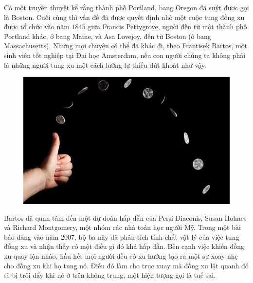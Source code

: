 \vspace*{185pt}

%
%

\begin{multicols}{2}
	Có một truyền thuyết  kể rằng thành phố Portland, bang Oregon đã suýt được gọi là Boston. Cuối cùng thì vấn đề đã được quyết định nhờ một cuộc tung đồng xu được tổ chức vào năm $1845$ giữa Francis Pettygrove, người đến từ một thành phố Portland khác, ở bang Maine, và Asa Lovejoy, đến từ Boston (ở bang Massachusetts). Nhưng mọi chuyện có thể đã khác đi, theo Frantisek Bartos, một sinh viên tốt nghiệp tại Đại học Amsterdam, nếu con người chúng ta  không phải là những người tung xu một cách lưỡng lự thiếu dứt khoát như vậy.
	\begin{figure}[H]
		\vspace*{-5pt}
		\centering
		\captionsetup{labelformat= empty, justification=centering}
		\includegraphics[width= 1\linewidth]{1111}
		\vspace*{-15pt}
	\end{figure}
	Bartos đã quan tâm đến một dự đoán hấp dẫn của Persi Diaconis, Susan Holmes và Richard Montgomery, một nhóm các nhà toán học người Mỹ. Trong một bài báo đăng vào năm $2007$, bộ ba này đã phân tích tính chất vật lý của việc tung đồng xu và nhận thấy có một điều gì đó khá hấp dẫn. Bên cạnh việc khiến đồng xu quay lộn nhào, hầu hết mọi người đều có xu hướng tạo ra một sự xoay nhẹ cho đồng xu khi họ tung nó. Điều đó làm cho trục xuay mà đồng xu lật quanh đó sẽ bị trôi đẩy khi nó ở trên không trung, một hiện tượng gọi là tuế sai.

\end{multicols}

